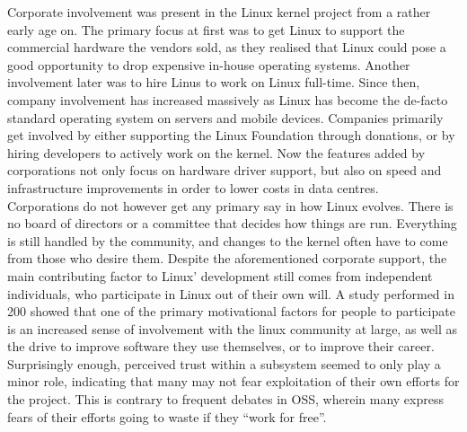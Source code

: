 Corporate involvement was present in the Linux kernel project from a rather early age on\cite{linus-biography}. The primary focus at first was to get Linux to support the commercial hardware the vendors sold, as they realised that Linux could pose a good opportunity to drop expensive in-house operating systems. Another involvement later was to hire Linus to work on Linux full-time. Since then, company involvement has increased massively as Linux has become the de-facto standard operating system on servers\cite{linux-server} and mobile devices\cite{linux-usage}. Companies primarily get involved by either supporting the Linux Foundation through donations\cite{linux-foundation}, or by hiring developers to actively work on the kernel\cite{linux-whowrites}. Now the features added by corporations not only focus on hardware driver support, but also on speed and infrastructure improvements in order to lower costs in data centres\cite{linux-bbr}. \\

Corporations do not however get any primary say in how Linux evolves. There is no board of directors or a committee that decides how things are run. Everything is still handled by the community, and changes to the kernel often have to come from those who desire them. Despite the aforementioned corporate support, the main contributing factor to Linux' development still comes from independent individuals, who participate in Linux out of their own will. A study performed in 200 \citet{linux-motivation} showed that one of the primary motivational factors for people to participate is an increased sense of involvement with the linux community at large, as well as the drive to improve software they use themselves, or to improve their career. Surprisingly enough, perceived trust within a subsystem seemed to only play a minor role, indicating that many may not fear exploitation of their own efforts for the project. This is contrary to frequent debates in OSS, wherein many express fears of their efforts going to waste if they ``work for free''. \\





